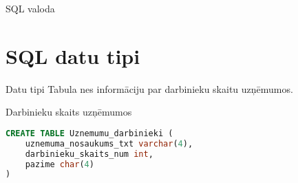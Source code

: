 \documentclass{beamer}
\begin{document}
  \begin{frame}{SQL valoda}
  \centering 
  \vspace{-0.3cm}
     \\ \pause 
    \vspace{0.2cm}
    \end{frame}


\section{SQL datu tipi}
       
    
    
   
 




        


    \begin{frame}[fragile]{Datu tipi}
        \vspace{0.5cm}
        Tabula \texttt{\color[RGB]{1, 0, 92}{Uznemumu\_darbinieki}} nes informāciju par darbinieku skaitu uzņēmumos.
        \begin{block}{Darbinieku skaits uzņēmumos}
            \begin{lstlisting}[language=SQL]
CREATE TABLE Uznemumu_darbinieki (
    uznemuma_nosaukums_txt varchar(4),
    darbinieku_skaits_num int,
    pazime char(4)
)\end{lstlisting}
        \end{block}
    \end{frame}
\end{document}
